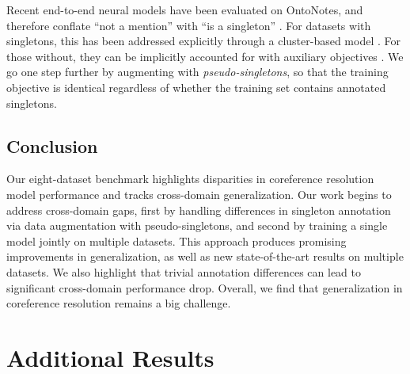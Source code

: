 \documentclass[12pt]{thesis-umich}[thesis]
\begin{document}
Recent end-to-end neural models have been evaluated on OntoNotes, and therefore conflate ``not a mention'' with ``is a singleton'' \cite{lee-etal-2017-end, lee-etal-2018-higher, kantor-globerson-2019-coreference, wu-etal-2020-corefqa}.
For datasets with singletons, this has been addressed explicitly through a cluster-based model \cite{toshniwal-etal-2020-learning, yu-etal-2020-cluster}. For those without, they can be implicitly accounted for with auxiliary objectives \cite{zhang-etal-2018-neural, swayamdipta-etal-2018-syntactic}. We go one step further 
by augmenting with \textit{pseudo-singletons}, so that the training objective is identical regardless of whether the training set contains annotated singletons.  \subsection{Conclusion}
Our eight-dataset benchmark highlights disparities in coreference resolution model performance and tracks cross-domain generalization.
Our work begins to address cross-domain gaps, first by handling differences in singleton annotation via data augmentation with pseudo-singletons, and second by training a single model jointly on multiple datasets.  
This approach produces promising improvements in generalization, as well as new state-of-the-art results on multiple datasets.  
We also highlight that trivial annotation differences can lead to significant cross-domain performance drop.  
Overall, we find that generalization in coreference resolution remains a big challenge.


  \section{Additional Results}
\label{sec:additional_res}
\end{document}
